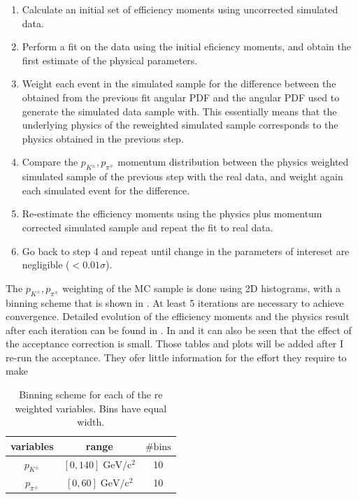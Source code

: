 \begin{enumerate}
\item Calculate an initial set of efficiency moments using uncorrected \BsJpsiKst simulated data.
\item Perform a fit on the \BsJpsiKst data using the initial eficiency moments, and obtain the first estimate of the physical parameters.
\item Weight each event in the simulated sample for the difference between the obtained from the previous fit angular PDF and the angular PDF used to 
      generate the simulated data sample with. 
      This essentially means that the underlying physics of the reweighted simulated  sample corresponds to the physics obtained in the previous step.
\item Compare the $p_{K^{\pm}},p_{\pi^{\mp}}$ momentum distribution between the physics weighted simulated sample of the previous step with the 
      real data, and weight again each simulated event for the difference.
\item Re-estimate the efficiency moments using the physics plus momentum corrected \BsJpsiKst simulated sample and repeat the fit to \BsJpsiKst real data.
\item Go back to step 4 and repeat until change in the parameters of intereset are negligible ($<0.01\sigma$).
\end{enumerate} 

The $p_{K^{\pm}},p_{\pi^{\mp}}$ weighting of the MC sample is done using 2D histograms, with a binning scheme that is shown in . 
At least 5 iterations are necessary to achieve convergence. Detailed evolution of the efficiency moments and the physics result after each iteration
can be found in \appref{}. In \tabref{} and \figref{} it can also be seen that the effect of the acceptance correction is small. {\color{red}Those tables
and plots will be added after I re-run the acceptance. They ofer little information for the effort they require to make }

\begin{table}[!h]
  \center
  \caption{\small Binning scheme for each of the re weighted variables. Bins have equal width.}
  \begin{tabular}{c c c}
    \hline
     variables & range & $\# \text{bins}$ \\
    \hline
    $p_{K^{\pm}}$    &  $[0,140]    \;  \text{GeV}/\text{c}^2$  & 10      \\ 
    $p_{\pi^{\pm}}$  &  $[0,60]      \;  \text{GeV}/\text{c}^2$  & 10      \\ 
    \hline
  \end{tabular}
  \label{angAccBinning}
\end{table}


